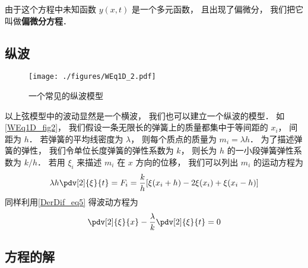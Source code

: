 由于这个方程中未知函数 $y(x,t)$ 是一个多元函数， 且出现了偏微分， 我们把它叫做\textbf{偏微分方程}．

\subsection{纵波}

\begin{figure}[ht]
\centering
\texttt{[image: ./figures/WEq1D\_2.pdf]}
\caption{一个常见的纵波模型} \label{WEq1D_fig2}
\end{figure}

以上弦模型中的波动显然是一个横波， 我们也可以建立一个纵波的模型． 如\autoref{WEq1D_fig2}， 我们假设一条无限长的弹簧上的质量都集中于等间距的 $x_i$， 间距为 $h$． 若弹簧的平均线密度为 $\lambda$， 则每个质点的质量为 $m_i = \lambda h$． 为了描述弹簧的弹性， 我们令单位长度弹簧的弹性系数为 $k$， 则长为 $h$ 的一小段弹簧弹性系数为 $k/h$． 若用 $\xi_i$ 来描述 $m_i$ 在 $x$ 方向的位移， 我们可以列出 $m_i$ 的运动方程为
\begin{equation}
\lambda h \pdv[2]{\xi}{t} = F_i = \frac kh [\xi(x_i + h) - 2\xi(x_i) + \xi(x_i - h)]
\end{equation}
同样利用\autoref{DerDif_eq5} 得波动方程为
\begin{equation}
\pdv[2]{\xi}{x} - \frac{\lambda}{k}\pdv[2]{\xi}{t} = 0
\end{equation}

\subsection{方程的解}


